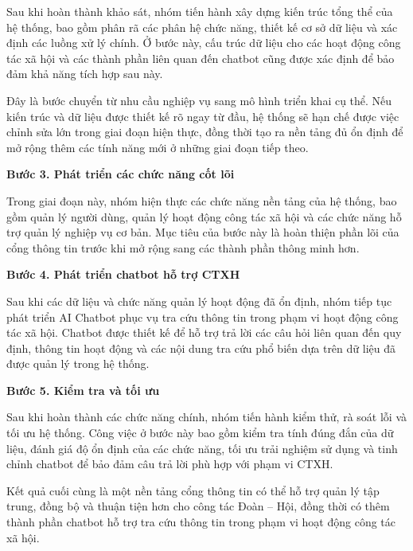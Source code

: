 Sau khi hoàn thành khảo sát, nhóm tiến hành xây dựng kiến trúc tổng thể của hệ thống, bao gồm phân rã các phân hệ chức năng, thiết kế cơ sở dữ liệu và xác định các luồng xử lý chính. Ở bước này, cấu trúc dữ liệu cho các hoạt động công tác xã hội và các thành phần liên quan đến chatbot cũng được xác định để bảo đảm khả năng tích hợp sau này.

Đây là bước chuyển từ nhu cầu nghiệp vụ sang mô hình triển khai cụ thể. Nếu kiến trúc và dữ liệu được thiết kế rõ ngay từ đầu, hệ thống sẽ hạn chế được việc chỉnh sửa lớn trong giai đoạn hiện thực, đồng thời tạo ra nền tảng đủ ổn định để mở rộng thêm các tính năng mới ở những giai đoạn tiếp theo.

\textbf{Bước 3. Phát triển các chức năng cốt lõi}

Trong giai đoạn này, nhóm hiện thực các chức năng nền tảng của hệ thống, bao gồm quản lý người dùng, quản lý hoạt động công tác xã hội và các chức năng hỗ trợ quản lý nghiệp vụ cơ bản. Mục tiêu của bước này là hoàn thiện phần lõi của cổng thông tin trước khi mở rộng sang các thành phần thông minh hơn.

\textbf{Bước 4. Phát triển chatbot hỗ trợ CTXH}

Sau khi các dữ liệu và chức năng quản lý hoạt động đã ổn định, nhóm tiếp tục phát triển AI Chatbot phục vụ tra cứu thông tin trong phạm vi hoạt động công tác xã hội. Chatbot được thiết kế để hỗ trợ trả lời các câu hỏi liên quan đến quy định, thông tin hoạt động và các nội dung tra cứu phổ biến dựa trên dữ liệu đã được quản lý trong hệ thống.

\textbf{Bước 5. Kiểm tra và tối ưu}

Sau khi hoàn thành các chức năng chính, nhóm tiến hành kiểm thử, rà soát lỗi và tối ưu hệ thống. Công việc ở bước này bao gồm kiểm tra tính đúng đắn của dữ liệu, đánh giá độ ổn định của các chức năng, tối ưu trải nghiệm sử dụng và tinh chỉnh chatbot để bảo đảm câu trả lời phù hợp với phạm vi CTXH.

Kết quả cuối cùng là một nền tảng cổng thông tin có thể hỗ trợ quản lý tập trung, đồng bộ và thuận tiện hơn cho công tác Đoàn -- Hội, đồng thời có thêm thành phần chatbot hỗ trợ tra cứu thông tin trong phạm vi hoạt động công tác xã hội.

\clearpage